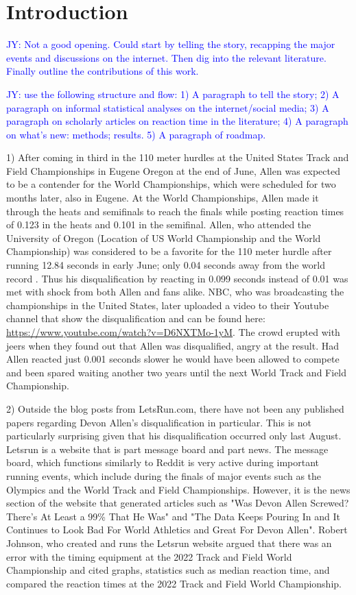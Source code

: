 \documentclass[12pt, letterpaper, titlepage]{article}
\newcommand{\jy}[1]{\textcolor{blue}{JY: #1}}
\begin{document}
\section{Introduction}
\label{sec:intro}


\jy{Not a good opening. Could start by telling the story, recapping the major
  events and discussions on the internet. Then dig into the relevant
  literature. Finally outline the contributions of this work.
}


\jy{use the following structure and flow:
  1) A paragraph to tell the story;
  2) A paragraph on informal statistical analyses on the internet/social media;
  3) A paragraph on scholarly articles on reaction time in the literature;
  4) A paragraph on what's new: methods; results.
  5) A paragraph of roadmap.}


1)
After coming in third in the 110 meter hurdles at the United States Track and 
Field Championships in Eugene Oregon at the end of June, Allen was expected to 
be a contender for the World Championships, which were scheduled for two months 
later, also in Eugene. At the World Championships, Allen made it through the 
heats and semifinals to reach the finals while posting reaction times of 0.123
in the heats and 0.101 in the semifinal.  Allen, who attended the University
of Oregon (Location of US World Championship and the World Championship) was
considered to be a favorite for the 110 meter hurdle after running 12.84 seconds
in early June; only 0.04 seconds away from the world record \citep{Preview}.
Thus his disqualification by reacting in 0.099 seconds instead of 0.01 was met
with shock from both Allen and fans alike.  NBC, who was broadcasting the
championships in the United States, later uploaded a video to their Youtube
channel that show the disqualification and can be found here:
\url{https://www.youtube.com/watch?v=D6NXTMo-1yM}. The crowd erupted with jeers when
they found out that Allen was disqualified, angry at the result.  Had Allen 
reacted just 0.001 seconds slower he would have been allowed to compete and been 
spared waiting another two years until the next World Track and Field Championship.

2)
Outside the blog posts from LetsRun.com, there have not been any published
papers regarding Devon Allen's disqualification in particular.  This is not
particularly surprising given that his disqualification occurred only last August.
Letsrun is a website that is part message board and part news.  The message board,
which functions similarly to Reddit is very active during important running
events, which include during the finals of major events such as
the Olympics and the World Track and Field Championships.  However, it is the
news section of the website that generated articles such as "Was Devon Allen
Screwed? There's At Least a 99\% That He Was" and "The Data Keeps Pouring In and
It Continues to Look Bad For World Athletics and Great For Devon Allen".  Robert
Johnson, who created and runs the Letsrun website argued that there was an error
with the timing equipment at the 2022 Track and Field World Championship and
cited graphs, statistics such as median reaction time, and compared the reaction
times at the 2022 Track and Field World Championship.  
\end{document}
